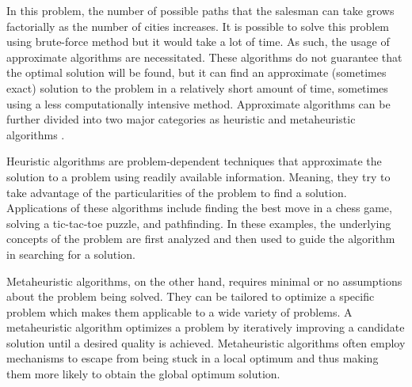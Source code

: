 \par In this problem, the number of possible paths that the salesman can take grows factorially as the number of cities increases. It is possible to solve this problem using brute-force method but it would take a lot of time. As such, the usage of approximate algorithms are necessitated. These algorithms do not guarantee that the optimal solution will be found, but it can find an approximate (sometimes exact) solution to the problem in a relatively short amount of time, sometimes using a less computationally intensive method. Approximate algorithms can be further divided into two major categories as heuristic and metaheuristic algorithms \cite{desale_2015}.

\par Heuristic algorithms are problem-dependent techniques that approximate the solution to a problem using readily available information. Meaning, they try to take advantage of the particularities of the problem to find a solution. Applications of these algorithms include finding the best move in a chess game, solving a tic-tac-toe puzzle, and pathfinding. In these examples, the underlying concepts of the problem are first analyzed and then used to guide the algorithm in searching for a solution.

\par Metaheuristic algorithms, on the other hand, requires minimal or no assumptions about the problem being solved. They can be tailored to optimize a specific problem which makes them applicable to a wide variety of problems. A metaheuristic algorithm optimizes a problem by iteratively improving a candidate solution until a desired quality is achieved. Metaheuristic algorithms often employ mechanisms to escape from being stuck in a local optimum and thus making them more likely to obtain the global optimum solution.

